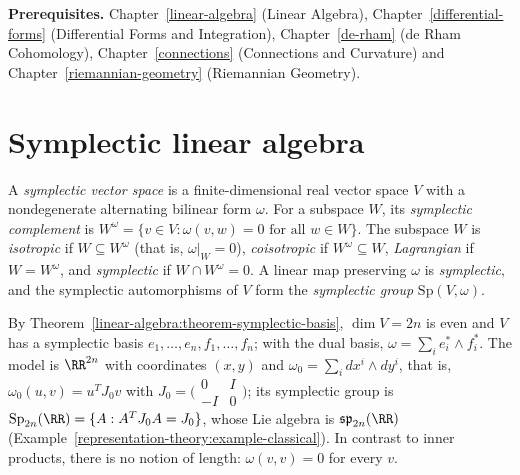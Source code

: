 \noindent\textbf{Prerequisites.} Chapter~\ref{linear-algebra} (Linear Algebra), Chapter~\ref{differential-forms} (Differential Forms and Integration), Chapter~\ref{de-rham} (de Rham Cohomology),
Chapter~\ref{connections} (Connections and Curvature) and Chapter~\ref{riemannian-geometry} (Riemannian Geometry).

\section{Symplectic linear algebra}\label{symplectic-geometry:section-linear}

\begin{definition}\label{symplectic-geometry:definition-symplectic-vector-space}
A \emph{symplectic vector space} is a finite-dimensional real vector space $V$ with a nondegenerate alternating bilinear form $\omega$. For a subspace $W$, its \emph{symplectic complement} is
$W^\omega = \{v \in V : \omega(v, w) = 0 \text{ for all } w \in W\}$. The subspace $W$ is \emph{isotropic} if $W \subseteq W^\omega$ (that is, $\omega|_W = 0$), \emph{coisotropic} if $W^\omega \subseteq W$,
\emph{Lagrangian} if $W = W^\omega$, and \emph{symplectic} if $W \cap W^\omega = 0$. A linear map preserving $\omega$ is \emph{symplectic}, and the symplectic automorphisms of $V$ form the
\emph{symplectic group} $\mathrm{Sp}(V, \omega)$.
\end{definition}

By Theorem~\ref{linear-algebra:theorem-symplectic-basis}, $\dim V = 2n$ is even and $V$ has a symplectic basis $e_1, \ldots, e_n, f_1, \ldots, f_n$; with the dual basis,
$\omega = \sum_ie_i^* \wedge f_i^*$. The model is $\RR^{2n}$ with coordinates $(x, y)$ and $\omega_0 = \sum_idx^i \wedge dy^i$, that is, $\omega_0(u, v) = u^TJ_0v$ with
$J_0 = \bigl(\begin{smallmatrix}0 & I\\ -I & 0\end{smallmatrix}\bigr)$; its symplectic group is $\mathrm{Sp}_{2n}(\RR) = \{A : A^TJ_0A = J_0\}$, whose Lie algebra is $\mathfrak{sp}_{2n}(\RR)$
(Example~\ref{representation-theory:example-classical}). In contrast to inner products, there is no notion of length: $\omega(v, v) = 0$ for every $v$.

